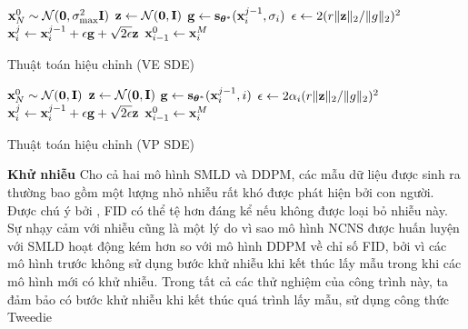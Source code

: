 \documentclass{article} %
\begin{document}
\begin{algorithm}[h!]
    \DontPrintSemicolon
    $\bold{x}_N^0 \sim \mathcal{N}(\bold{0}, \sigma_{\max}^2 \bold{I})$\;
     {
         {
            $\bold{z} \gets  \mathcal{N}(\bold{0}, \bold{I})$\;
            $\bold{g} \gets \bold{s}_{\boldsymbol{\theta}^{\ast}}(\bold{x}_i^{j-1}, \sigma_i)$\;
            $\epsilon \gets 2 (r \lVert \bold{z} \rVert_2 / \lVert g \rVert_2)^2$\;
            $\bold{x}_i^j \gets \bold{x}_i^{j-1} + \epsilon \bold{g} + \sqrt{2 \epsilon} \bold{z}$\;
        }
        $\bold{x}_{i-1}^0 \gets \bold{x}_i^M$\;
    }
    \;
    \caption{Thuật toán hiệu chỉnh (VE SDE)}
    \label{alg:4}
\end{algorithm}

\begin{algorithm}[h!]
    \DontPrintSemicolon
    $\bold{x}_N^0 \sim \mathcal{N}(\bold{0}, \bold{I})$\;
     {
         {
            $\bold{z} \gets  \mathcal{N}(\bold{0}, \bold{I})$\;
            $\bold{g} \gets \bold{s}_{\boldsymbol{\theta}^{\ast}}(\bold{x}_i^{j-1}, i)$\;
            $\epsilon \gets 2 \alpha_i (r \lVert \bold{z} \rVert_2 / \lVert g \rVert_2)^2$\;
            $\bold{x}_i^j \gets \bold{x}_i^{j-1} + \epsilon \bold{g} + \sqrt{2 \epsilon} \bold{z}$\;
        }
        $\bold{x}_{i-1}^0 \gets \bold{x}_i^M$\;
    }
    \;
    \caption{Thuật toán hiệu chỉnh (VP SDE)}
    \label{alg:5}
\end{algorithm}

\textbf{Khử nhiễu} Cho cả hai mô hình SMLD và DDPM, các mẫu dữ liệu được sinh ra thường bao gồm một lượng nhỏ nhiễu rất khó được phát hiện bởi con người.
Được chú ý bởi \citep{jolicoeur2020adversarial}, FID có thể tệ hơn đáng kể nếu không được loại bỏ nhiễu này.
Sự nhạy cảm với nhiễu cũng là một lý do vì sao mô hình NCNS được huấn luyện với SMLD hoạt động kém hơn so với mô hình DDPM về chỉ số FID, bởi vì các mô hình trước không sử dụng bước khử nhiễu khi kết thúc lấy mẫu trong khi các mô hình mới có khử nhiễu.
Trong tất cả các thử nghiệm của công trình này, ta đảm bảo có bước khử nhiễu khi kết thúc quá trình lấy mẫu, sử dụng công thức Tweedie \citep{efron2011tweedie}
\end{document}

